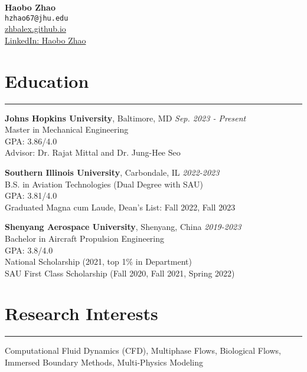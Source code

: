 \documentclass[11pt]{article}
\begin{document}

\begin{center}
    {\LARGE \textbf{Haobo Zhao}} \\
    \vspace{2mm}
    \small
    \texttt{hzhao67@jhu.edu} \\
    \vspace{1mm}
    \href{https://zhbalex.github.io}{zhbalex.github.io} \\
    \href{https://www.linkedin.com/in/haobo-zhao-035529229}{LinkedIn: Haobo Zhao}
\end{center}

\vspace{2mm}

\section*{Education}
\hrule

\noindent\textbf{Johns Hopkins University}, Baltimore, MD \hfill \textit{Sep. 2023 - Present} \\
Master in Mechanical Engineering \\
GPA: 3.86/4.0 \\
Advisor: Dr. Rajat Mittal and Dr. Jung-Hee Seo

\vspace{2mm}

\noindent\textbf{Southern Illinois University}, Carbondale, IL \hfill \textit{2022-2023} \\
B.S. in Aviation Technologies (Dual Degree with SAU) \\
GPA: 3.81/4.0 \\
Graduated Magna cum Laude, Dean's List: Fall 2022, Fall 2023

\vspace{2mm}

\noindent\textbf{Shenyang Aerospace University}, Shenyang, China \hfill \textit{2019-2023} \\
Bachelor in Aircraft Propulsion Engineering \\
GPA: 3.8/4.0 \\
National Scholarship (2021, top 1\% in Department) \\
SAU First Class Scholarship (Fall 2020, Fall 2021, Spring 2022)

\vspace{2mm}

\section*{Research Interests}
\hrule
Computational Fluid Dynamics (CFD), Multiphase Flows, Biological Flows, Immersed Boundary Methods, Multi-Physics Modeling
\end{document}
